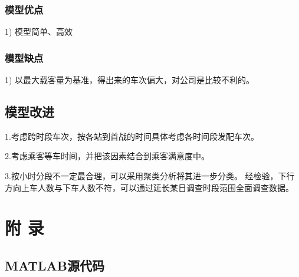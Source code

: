 \documentclass{cumcmart}
\begin{document}
\subsubsection{模型优点}
1)	模型简单、高效



\subsubsection{模型缺点}
1)	 以最大载客量为基准，得出来的车次偏大，对公司是比较不利的。



\subsection{模型改进}
1.考虑跨时段车次，按各站到首战的时间具体考虑各时间段发配车次。

2.考虑乘客等车时间，并把该因素结合到乘客满意度中。

3.按小时分段不一定最合理，可以采用聚类分析将其进一步分类。   
经检验，下行方向上车人数与下车人数不符，可以通过延长某日调查时段范围全面调查数据。     %

\begin{thebibliography}{10}
\end{thebibliography}


\newpage
\appendix
\section*{附 \quad 录}

\subsection{MATLAB源代码}
\end{document}
